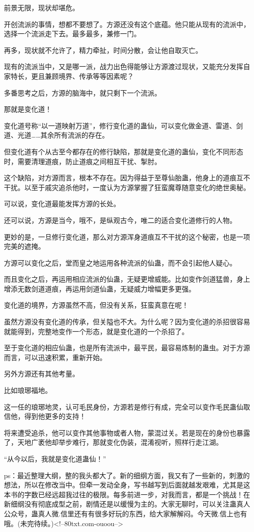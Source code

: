 \begin{this_body}
前景无限，现状却堪危。

开创流派的事情，想都不要想了。方源还没有这个底蕴。他只能从现有的流派中，选择一个流派走下去。最多最多，兼修一门。

再多，现状就不允许了，精力牵扯，时间分散，会让他自取灭亡。

现有的流派当中，又是哪一派，战力出色得能够让方源渡过现状，又能充分发挥自家特长，更且兼顾境界、传承等等因素呢？

多番思考之后，方源的脑海中，就只剩下一个流派。

那就是变化道！

变化道号称“以一道映射万道”，修行变化道的蛊仙，可以变化做金道、雷道、剑道、光道……其余所有流派的存在。

但变化道有个从古至今都存在的修行缺陷，那就是变化道的蛊仙，变化不同形态时，需要清理道痕，防止道痕之间相互干扰、掣肘。

这个缺陷，对方源而言，根本不存在。因为得益于至尊仙胎蛊，他身上的道痕互不干扰。以至于戚灾追杀他时，一度认为方源掌握了狂蛮魔尊随意变化的绝世奥秘。

可以说，变化道最能发挥方源的长处。

还可以说，方源是当今，哦不，是纵观古今，唯二的适合变化道修行的人物。

更妙的是，一旦修行变化道，那么对方源浑身道痕互不干扰的这个秘密，也是一项完美的遮掩。

方源可以变化之后，堂而皇之地运用各种流派的仙蛊，而不会引起他人疑心。

而且变化之后，再运用相应流派的仙蛊，无疑更增威能。比如变作剑道猛兽，身上增添无数剑道道痕，再运用剑道仙蛊，无疑威力增幅更多更强。

变化道的境界，方源虽然不高，但没有关系，狂蛮真意在呢！

虽然方源没有变化道的传承，但关隘也不大。为什么呢？因为变化道的杀招很容易就能得到，完整地变作一个形态，就是变化道的一个杀招了。

至于变化道的相应仙蛊，也是所有流派中，最平民，最容易炼制的蛊虫。对于方源而言，可以迅速积累，重新开始。

另外方源还有其他考量。

比如琅琊福地。

这一任的琅琊地灵，认可毛民身份，方源若是修行有成，完全可以变作毛民蛊仙取信他，得到他更多的支持！

将来遭受追杀，他可以变作其他事物或者人物，蒙混过关。若是现在的身份也暴露了，天地广袤他却举步难行，那就变化伪装，混淆视听，照样行走江湖。

“从今以后，我就是变化道蛊仙！”

ps：最近整理大纲，整的我头都大了。新的细纲方面，我又有了一些新的，刺激的想法，所以在修改当中。但牵一发动全身，写书越写到后面就越发艰难，尤其是这本书的字数已经远超我过往的极限。每多前进一步，对我而言，都是一个挑战！在新细纲没有彻底成型之前，剧情还是以缓慢为主的。大家无聊时，可以关注蛊真人公众号，蛊真人微.信里还有有很多好玩的东西，给大家解解闷。今天微.信上也有哦。(未完待续。)<!--80txt.com-ouoou-->

\end{this_body}

